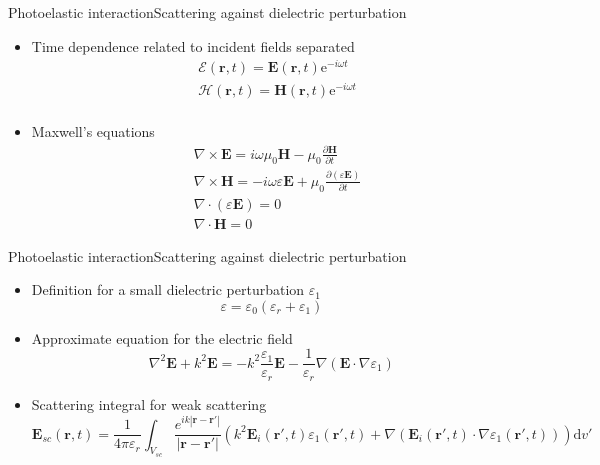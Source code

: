 \documentclass[11pt]{beamer}
\begin{document}
	\begin{frame}{Photoelastic interaction}{Scattering against dielectric perturbation}
		\begin{itemize}
			\item Time dependence related to incident fields separated
			\begin{align*}
				&\bm{\mathcal{E}}(\bm{r},t) = \bm{E}(\bm{r},t) \text{e}^{-i\omega t} \\
				&\bm{\mathcal{H}}(\bm{r},t) = \bm{H}(\bm{r},t) \text{e}^{-i\omega t} \\
			\end{align*}
			\item Maxwell's equations
			\begin{align*}
				&\nabla \times \bm{E} = i\omega \mu_0 \bm{H} - \mu_0 \frac{\partial \bm{H}}{\partial t} \\
				&\nabla \times \bm{H} = -i\omega \varepsilon \bm{E} + \mu_0 \frac{\partial (\varepsilon \bm{E})}{\partial t} \\
				&\nabla \cdot (\varepsilon \bm{E}) = 0 \\
				&\nabla \cdot \bm{H} = 0
			\end{align*}
		\end{itemize}
	\end{frame}
		
	\begin{frame}{Photoelastic interaction}{Scattering against dielectric perturbation}
		\begin{itemize}
			\item Definition for a small dielectric perturbation $\varepsilon_1$
			\begin{equation*}
				\varepsilon = \varepsilon_0(\varepsilon_r + \varepsilon_1)
			\end{equation*}
			\item Approximate equation for the electric field
			\begin{equation*}
				\nabla^2\bm{E} + k^2 \bm{E} =
				-k^2 \frac{\varepsilon_1}{\varepsilon_r} \bm{E} -\frac{1}{\varepsilon_r}\nabla(\bm{E} \cdot \nabla \varepsilon_1)
			\end{equation*}
			\item Scattering integral for weak scattering
			{\footnotesize \begin{equation*}
				\bm{E}_{sc}(\bm{r},t) = \frac{1}{4\pi\varepsilon_r} \int_{V_{sc}} \frac{e^{ik |\bm{r}-\bm{r'}| }}{ |\bm{r}-\bm{r'}|} \left( k^2 \bm{E}_i (\bm{r'},t) \varepsilon_1 (\bm{r'},t) + \nabla (\bm{E}_i (\bm{r'},t) \cdot \nabla \varepsilon_1 (\bm{r'},t)) \right) \mathrm{d}v'
			\end{equation*}}
		\end{itemize}
	\end{frame}
	
\end{document}
